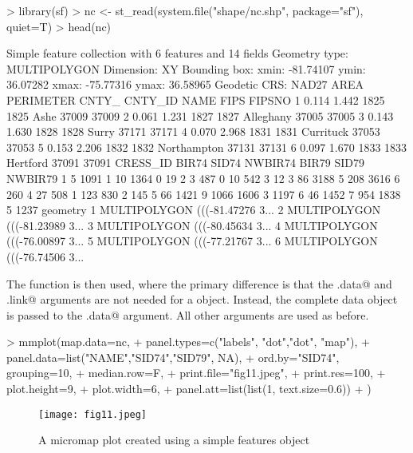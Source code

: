 \documentclass{article}
\begin{document}
\begin{Schunk}
\begin{Sinput}
> library(sf)
> nc <- st_read(system.file("shape/nc.shp", package="sf"), quiet=T)
> head(nc)
\end{Sinput}
\begin{Soutput}
Simple feature collection with 6 features and 14 fields
Geometry type: MULTIPOLYGON
Dimension:     XY
Bounding box:  xmin: -81.74107 ymin: 36.07282 xmax: -75.77316 ymax: 36.58965
Geodetic CRS:  NAD27
   AREA PERIMETER CNTY_ CNTY_ID        NAME  FIPS FIPSNO
1 0.114     1.442  1825    1825        Ashe 37009  37009
2 0.061     1.231  1827    1827   Alleghany 37005  37005
3 0.143     1.630  1828    1828       Surry 37171  37171
4 0.070     2.968  1831    1831   Currituck 37053  37053
5 0.153     2.206  1832    1832 Northampton 37131  37131
6 0.097     1.670  1833    1833    Hertford 37091  37091
  CRESS_ID BIR74 SID74 NWBIR74 BIR79 SID79 NWBIR79
1        5  1091     1      10  1364     0      19
2        3   487     0      10   542     3      12
3       86  3188     5     208  3616     6     260
4       27   508     1     123   830     2     145
5       66  1421     9    1066  1606     3    1197
6       46  1452     7     954  1838     5    1237
                        geometry
1 MULTIPOLYGON (((-81.47276 3...
2 MULTIPOLYGON (((-81.23989 3...
3 MULTIPOLYGON (((-80.45634 3...
4 MULTIPOLYGON (((-76.00897 3...
5 MULTIPOLYGON (((-77.21767 3...
6 MULTIPOLYGON (((-76.74506 3...
\end{Soutput}
\end{Schunk}

The \verb@mmplot@ function is then used, where the primary difference is that the \verb@stat.data@ and \verb@map.link@ arguments are not needed for a \verb@sf@ object.  Instead, the complete \verb@nc@ data object is passed to the \verb@map.data@ argument.  All other arguments are used as before.  

\begin{Schunk}
\begin{Sinput}
> mmplot(map.data=nc,
+        panel.types=c("labels", "dot","dot", "map"),
+        panel.data=list("NAME","SID74","SID79", NA),
+        ord.by="SID74", grouping=10,
+        median.row=F,
+        print.file="fig11.jpeg",
+        print.res=100, 
+        plot.height=9, 
+        plot.width=6, 
+        panel.att=list(list(1, text.size=0.6))
+ ) 
\end{Sinput}
\end{Schunk}
\begin{figure}[!tbp] 
\begin{center} 
\texttt{[image: fig11.jpeg]}
  \caption{A micromap plot created using a simple features object}
  \label{fig11} 
\end{center} 
\end{figure}
\end{document}

